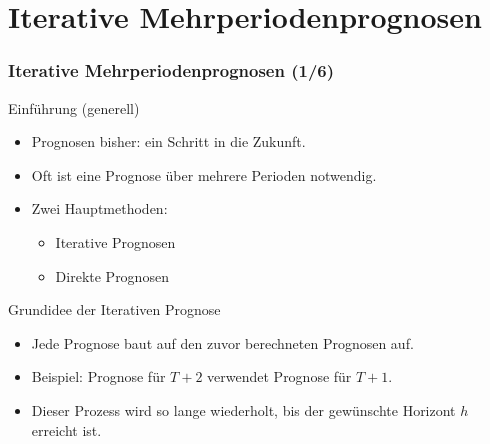 \documentclass[10pt,aspectratio=169]{beamer}\usepackage[]{graphicx}\usepackage[]{xcolor}
\begin{document}
\section*{Iterative Mehrperiodenprognosen}



\begin{frame}
  \frametitle{Iterative Mehrperiodenprognosen \hfill (1/6)}

  Einführung (generell)
  
  \begin{itemize}
    \item Prognosen bisher: ein Schritt in die Zukunft.
    \item Oft ist eine Prognose über mehrere Perioden notwendig.
    \item Zwei Hauptmethoden:
    \begin{itemize}
      \item Iterative Prognosen
      \item Direkte Prognosen
    \end{itemize}
  \end{itemize}  

  Grundidee der Iterativen Prognose
  
  \begin{itemize}
    \item Jede Prognose baut auf den zuvor berechneten Prognosen auf.
    \item Beispiel: Prognose für $T+2$ verwendet Prognose für $T+1$.
    \item Dieser Prozess wird so lange wiederholt, bis der gewünschte Horizont $h$ erreicht ist.
  \end{itemize}  

\end{frame}
\end{document}
